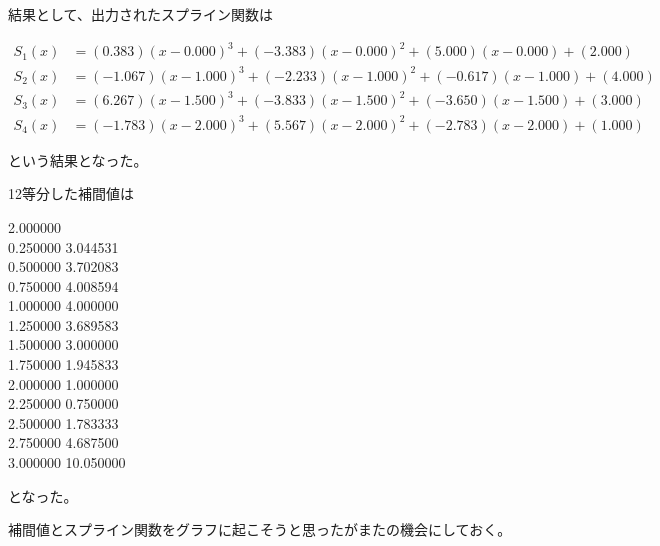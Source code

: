\documentclass[a4paper,11pt,dvipdfmx]{jsarticle}
\begin{document}
結果として、出力されたスプライン関数は
\begin{shaded}
    \noindent
    \begin{align*}
        S_1(x) &= ( 0.383)(x- 0.000)^3+(-3.383)(x- 0.000)^2+( 5.000)(x- 0.000)+( 2.000)\\
        S_2(x) &= (-1.067)(x- 1.000)^3+(-2.233)(x- 1.000)^2+(-0.617)(x- 1.000)+( 4.000)\\
        S_3(x) &= ( 6.267)(x- 1.500)^3+(-3.833)(x- 1.500)^2+(-3.650)(x- 1.500)+( 3.000)\\
        S_4(x) &= (-1.783)(x- 2.000)^3+( 5.567)(x- 2.000)^2+(-2.783)(x- 2.000)+( 1.000)
    \end{align*}
\end{shaded}
という結果となった。

12等分した補間値は
\begin{shaded}
       2.000000\\
    0.250000   3.044531\\
    0.500000   3.702083\\
    0.750000   4.008594\\
    1.000000   4.000000\\
    1.250000   3.689583\\
    1.500000   3.000000\\
    1.750000   1.945833\\
    2.000000   1.000000\\
    2.250000   0.750000\\
    2.500000   1.783333\\
    2.750000   4.687500\\
    3.000000  10.050000
\end{shaded}
となった。

補間値とスプライン関数をグラフに起こそうと思ったがまたの機会にしておく。
\end{document}
